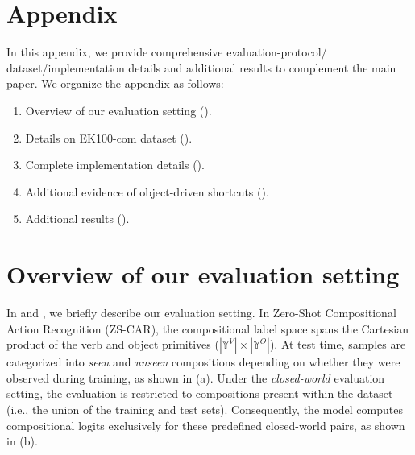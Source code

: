 


\appendix
\renewcommand{\theHsection}{appendix.\Alph{section}}
\section*{\Large \bf Appendix}

In this appendix, we provide comprehensive evaluation-protocol/
dataset/implementation details and additional results to complement the main paper. 
We organize the appendix as follows:

\begin{enumerate}
    \item Overview of our evaluation setting ().
    \item Details on EK100-com dataset ().
    \item Complete implementation details ().
    \item Additional evidence of object-driven shortcuts ().
    \item Additional results ().
\end{enumerate}



\section{Overview of our evaluation setting}
\label{sec:zscar_setting}
In  and , we briefly describe our evaluation setting.
In Zero-Shot Compositional Action Recognition (ZS-CAR), the compositional label space spans the Cartesian product of the verb and object primitives ($|\mathbb{Y}^V| \times |\mathbb{Y}^O|$). 
At test time, samples are categorized into \textit{seen} and \textit{unseen} compositions depending on whether they were observed during training, as shown in  (a). 
Under the \textit{closed-world} evaluation setting, the evaluation is restricted to compositions present within the dataset (i.e., the union of the training and test sets). 
Consequently, the model computes compositional logits exclusively for these predefined closed-world pairs, as shown in  (b).

